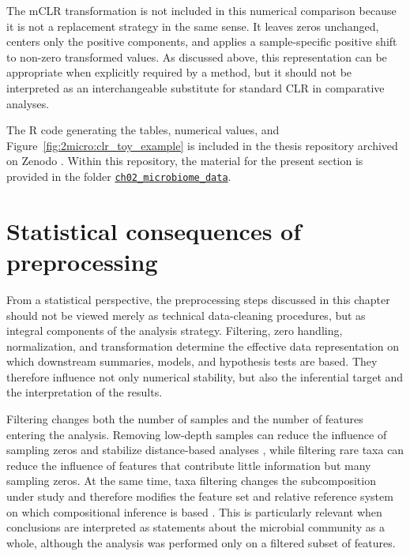 The mCLR transformation is not included in this numerical comparison because it is not a replacement strategy in the same sense. It leaves zeros unchanged, centers only the positive components, and applies a sample-specific positive shift to non-zero transformed values. As discussed above, this representation can be appropriate when explicitly required by a method, but it should not be interpreted as an interchangeable substitute for standard CLR in comparative analyses.

The R code generating the tables, numerical values, and Figure~\ref{fig:2micro:clr_toy_example} is included in the thesis repository archived on Zenodo \citep{Peschel2026thesisRepo}. Within this repository, the material for the present section is provided in the folder \href{https://github.com/stefpeschel/phd_thesis/tree/main/ch02_microbiome_data}{\texttt{ch02\_microbiome\_data}}.

\section{Statistical consequences of preprocessing}
\label{sec:2micro:preprocessing_consequences}

From a statistical perspective, the preprocessing steps discussed in this chapter should not be viewed merely as technical data-cleaning procedures, but as integral components of the analysis strategy. Filtering, zero handling, normalization, and transformation determine the effective data representation on which downstream summaries, models, and hypothesis tests are based. They therefore influence not only numerical stability, but also the inferential target and the interpretation of the results.

Filtering changes both the number of samples and the number of features entering the analysis. Removing low-depth samples can reduce the influence of sampling zeros and stabilize distance-based analyses \citep{weiss2017normalization}, while filtering rare taxa can reduce the influence of features that contribute little information but many sampling zeros. At the same time, taxa filtering changes the subcomposition under study and therefore modifies the feature set and relative reference system on which compositional inference is based \citep{aitchison1986statistical}. This is particularly relevant when conclusions are interpreted as statements about the microbial community as a whole, although the analysis was performed only on a filtered subset of features.

